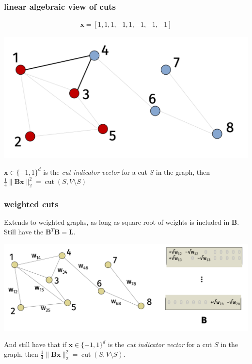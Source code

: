\documentclass[compress]{beamer}
\newcommand{\bv}[1]{\mathbf{#1}}
\DeclareMathOperator{\cut}{cut}
\begin{document}
\begin{frame}
	\frametitle{linear algebraic view of cuts}
	\begin{align*}
		\bv{x} = [1,1,1,-1,1,-1,-1,-1]
	\end{align*}
	\begin{center}
		\includegraphics[width=.8\textwidth]{cut_example.png}
	\end{center}
	\vspace{-1em}
	$\bv{x}\in \{-1,1\}^d$ is the \emph{cut indicator vector} for a cut $S$ in the graph, then $\frac{1}{4}\|\bv{B}\bv{x}\|_2^2 = \cut(S,V\setminus S)$	
\end{frame}

\begin{frame}
	\frametitle{weighted cuts}
	Extends to weighted graphs, as long as square root of weights is included in $\bv{B}$. Still have the $\bv{B}^T\bv{B} = \bv{L}$.
	\begin{center}
		\includegraphics[width=\textwidth]{weighted_edge_vertex.png}
	\end{center}
	\vspace{-1em}
	
	And still have that if $\bv{x}\in \{-1,1\}^d$ is the \emph{cut indicator vector} for a cut $S$ in the graph, then $\frac{1}{4}\|\bv{B}\bv{x}\|_2^2 = \cut(S,V\setminus S)$.	
\end{frame}
\end{document}
